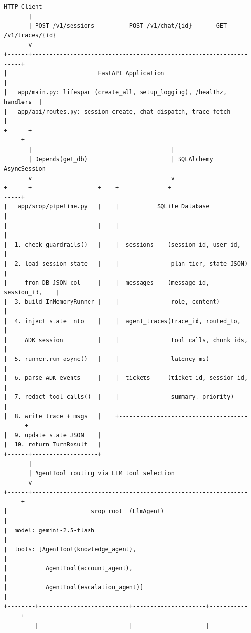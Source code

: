 \documentclass[12pt,a4paper]{article}
\begin{document}
\begin{center}
\begin{tcolorbox}[codebox]
\begin{lstlisting}[numbers=none, basicstyle=\ttfamily\scriptsize]
  HTTP Client
       |
       | POST /v1/sessions          POST /v1/chat/{id}       GET /v1/traces/{id}
       v
+------+-------------------------------------------------------------------+
|                          FastAPI Application                              |
|   app/main.py: lifespan (create_all, setup_logging), /healthz, handlers  |
|   app/api/routes.py: session create, chat dispatch, trace fetch           |
+------+-------------------------------------------------------------------+
       |                                        |
       | Depends(get_db)                        | SQLAlchemy AsyncSession
       v                                        v
+------+-------------------+    +--------------+---------------------------+
|   app/srop/pipeline.py   |    |           SQLite Database                |
|                          |    |                                           |
|  1. check_guardrails()   |    |  sessions    (session_id, user_id,       |
|  2. load session state   |    |               plan_tier, state JSON)     |
|     from DB JSON col     |    |  messages    (message_id, session_id,    |
|  3. build InMemoryRunner |    |               role, content)             |
|  4. inject state into    |    |  agent_traces(trace_id, routed_to,       |
|     ADK session          |    |               tool_calls, chunk_ids,     |
|  5. runner.run_async()   |    |               latency_ms)               |
|  6. parse ADK events     |    |  tickets     (ticket_id, session_id,     |
|  7. redact_tool_calls()  |    |               summary, priority)        |
|  8. write trace + msgs   |    +-------------------------------------------+
|  9. update state JSON    |
|  10. return TurnResult   |
+------+-------------------+
       |
       | AgentTool routing via LLM tool selection
       v
+------+-------------------------------------------------------------------+
|                        srop_root  (LlmAgent)                             |
|  model: gemini-2.5-flash                                                 |
|  tools: [AgentTool(knowledge_agent),                                     |
|           AgentTool(account_agent),                                      |
|           AgentTool(escalation_agent)]                                   |
+--------+--------------------------+---------------------+----------------+
         |                          |                     |

\end{lstlisting}
\end{tcolorbox}
\end{center}
\end{document}
